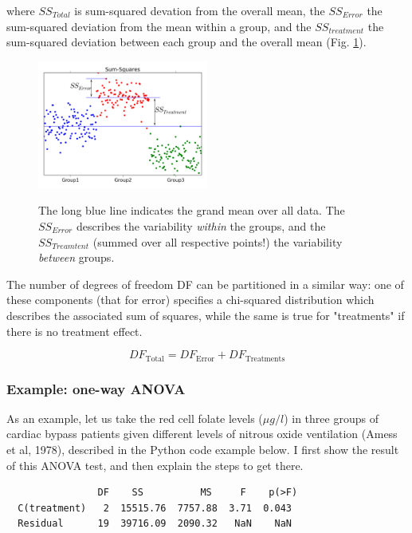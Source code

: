 where $SS_{Total}$ is sum-squared devation from the overall mean, the $SS_{Error}$ the sum-squared deviation from the mean within a group, and the $SS_{treatment}$ the sum-squared deviation between each group and the overall mean (Fig. \ref{fig:ANOVA_annotated}).
\begin{figure}
  \centering
  \includegraphics[width=0.5\textwidth]{../Images/anova_annotated.png}\\
  \caption{The long blue line indicates the grand mean over all data. The $SS_{Error}$ describes the variability \emph{within} the groups, and the $SS_{Treamtent}$ (summed over all respective points!) the variability \emph{between} groups.}\label{fig:ANOVA_annotated}
\end{figure}

The number of degrees of freedom DF can be partitioned in a similar way: one of these components (that for error) specifies a chi-squared distribution which describes the associated sum of squares, while the same is true for "treatments" if there is no treatment effect.

\begin{equation}
  DF_\text{Total} = DF_\text{Error} + DF_\text{Treatments}
\end{equation}


\subsubsection{Example: one-way ANOVA}
As an example, let us take the red cell folate levels ($\mu g/l$) in three groups of cardiac bypass patients given different levels of nitrous oxide ventilation (Amess et al, 1978), described in the Python code example below. I first show the result of this ANOVA test, and then explain the steps to get there.

\begin{verbatim}
                DF    SS          MS     F    p(>F)
  C(treatment)   2  15515.76  7757.88  3.71  0.043
  Residual      19  39716.09  2090.32   NaN    NaN
\end{verbatim}

